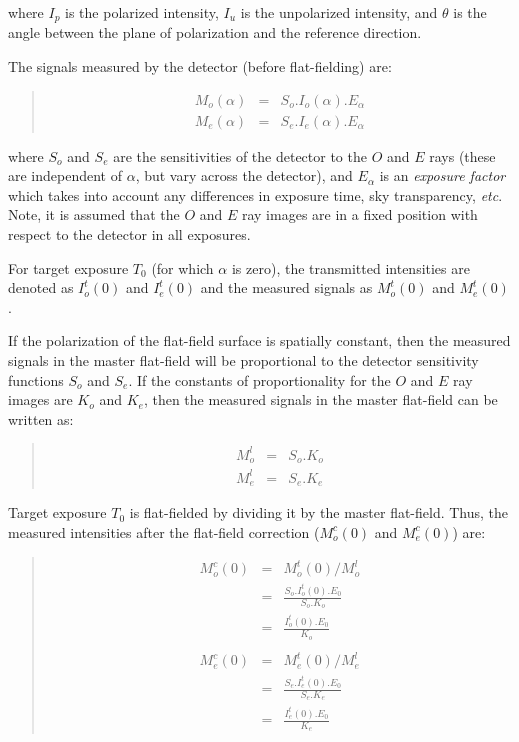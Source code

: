 \documentclass[twoside,11pt]{article}
\renewcommand{\_}{\texttt{\symbol{95}}}
\newenvironment{myquote}{\begin{quote}\begin{small}}{\end{small}\end{quote}}
\begin{document}
where $I_{p}$ is the polarized intensity, $I_{u}$ is the unpolarized
intensity, and $\theta$ is the angle between the plane of polarization
and the reference direction. 

The signals measured by the detector (before flat-fielding) are:

\begin{myquote}
\begin{eqnarray*}
  M_{o}(\alpha) & = & S_{o}.I_{o}(\alpha).E_{\alpha} \\
  M_{e}(\alpha) & = & S_{e}.I_{e}(\alpha).E_{\alpha}
\end{eqnarray*}
\end{myquote}

where $S_{o}$ and $S_{e}$ are the sensitivities of the detector to the $O$ 
and $E$ rays (these are independent of $\alpha$, but vary across the
detector), and $E_{\alpha}$ is an \emph{exposure factor} which takes into
account any differences in exposure time, sky transparency, \emph{etc}. Note, it
is assumed that the $O$ and $E$ ray images are in a fixed position
with respect to the detector in all exposures.

For target exposure $T_{0}$ (for which $\alpha$ is zero), the transmitted
intensities are denoted as $I^{t}_{o}(0)$ and $I^{t}_{e}(0)$ and the
measured signals as $M^{t}_{o}(0)$ and $M^{t}_{e}(0)$. 

If the polarization of the flat-field surface is spatially constant, then
the measured signals in the master flat-field will be proportional to
the detector sensitivity functions $S_{o}$ and $S_{e}$. If the constants
of proportionality for the $O$ and $E$ ray images are $K_{o}$ and
$K_{e}$, then the measured signals in the master flat-field can be
written as:

\begin{myquote}
\begin{eqnarray*}
  M^l_{o} & = & S_{o}.K_{o} \\
  M^l_{e} & = & S_{e}.K_{e}
\end{eqnarray*}
\end{myquote}

Target exposure $T_{0}$ is flat-fielded by dividing it by the master 
flat-field. Thus, the measured intensities after the flat-field correction
($M^{c}_{o}(0)$ and $M^{c}_{e}(0)$) are:

\begin{myquote}
\begin{eqnarray*}
  M^{c}_{o}(0) & = & M^{t}_{o}(0) / M^{l}_{o} \\
                    & = & \frac{ S_{o}.I^{t}_{o}(0).E_{0} }{ S_{o}.K_{o} } \\
                    & = & \frac{ I^{t}_{o}(0).E_{0} }{ K_{o} } \\ \\
  M^{c}_{e}(0) & = & M^{t}_{e}(0) / M^{l}_{e} \\
                    & = & \frac{ S_{e}.I^{t}_{e}(0).E_{0} }{ S_{e}.K_{e} } \\
                    & = & \frac{ I^{t}_{e}(0).E_{0} }{ K_{e} } 
\end{eqnarray*}
\end{myquote}
\end{document}
